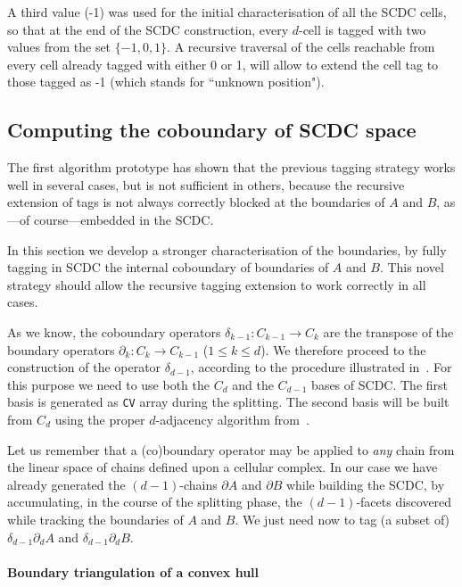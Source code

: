 \documentclass[11pt,oneside]{article}	%
\begin{document}
A third value (-1) was used for the initial characterisation of all the SCDC cells, so that at the end of the SCDC construction, every $d$-cell is tagged with two values from the set $\{-1,0,1\}$. A recursive traversal of the cells reachable from every cell already tagged with either 0 or 1, will allow to extend the cell tag to those tagged as -1 (which stands for ``unknown position").




\subsection{Computing the coboundary of SCDC space}
\label{sec:coboundary}

The first algorithm prototype has shown that the previous tagging strategy works well in several cases, but is not sufficient in others, because the recursive extension of tags is not always correctly blocked at the boundaries of $A$ and $B$, as---of course---embedded in the SCDC. 

In this section we develop a stronger characterisation of the boundaries, by fully tagging in SCDC the internal coboundary of boundaries of $A$ and $B$. This novel strategy should allow the recursive tagging extension to work correctly in all cases.

As we know, the  coboundary operators $\delta_{k-1}: C_{k-1} \to C_k$ are the transpose of the boundary operators $\partial_k: C_k \to C_{k-1}$ ($1\leq k\leq d$). We therefore proceed to the construction of the operator $\delta_{d-1}$, according to the procedure illustrated in~\cite{}. For this purpose we need to use both the $C_d$ and the $C_{d-1}$ bases of SCDC. The first basis is generated as \texttt{CV} array during the splitting. The second basis will be built from $C_d$ using the proper $d$-adjacency algorithm from~\cite{}. 

Let us remember that a (co)boundary operator may be applied to \emph{any} chain from the linear space of chains defined upon a cellular complex. 
In our case we have already generated the $(d-1)$-chains $\partial A$ and $\partial B$ while building the SCDC, by accumulating, in the course of the splitting phase, the $(d-1)$-facets discovered while tracking the boundaries of $A$ and $B$. We just need now to tag (a subset of) $\delta_{d-1}\partial_d A$ and $\delta_{d-1}\partial_d B$.

\paragraph{Boundary triangulation of a convex hull}
\end{document}
